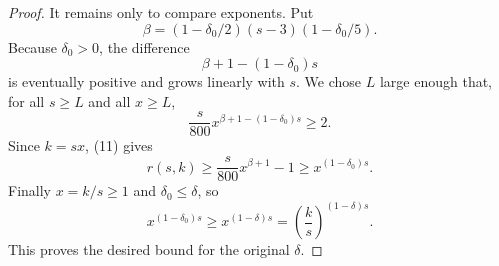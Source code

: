 \begin{proof}
It remains only to compare exponents. Put
\[
  \beta=(1-\delta_0/2)(s-3)(1-\delta_0/5).
\]
Because \(\delta_0>0\), the difference
\[
  \beta+1-(1-\delta_0)s
\]
is eventually positive and grows linearly with \(s\). We chose \(L\) large enough that, for all \(s\ge L\) and all \(x\ge L\),
\[
  \frac{s}{800}x^{\beta+1-(1-\delta_0)s}\ge2.
\]
Since \(k=sx\), (11) gives
\[
  r(s,k)\ge
  \frac{s}{800}x^{\beta+1}-1
  \ge x^{(1-\delta_0)s}.
\]
Finally \(x=k/s\ge1\) and \(\delta_0\le\delta\), so
\[
  x^{(1-\delta_0)s}\ge x^{(1-\delta)s}
  =
  \left(\frac{k}{s}\right)^{(1-\delta)s}.
\]
This proves the desired bound for the original \(\delta\).
\end{proof}
